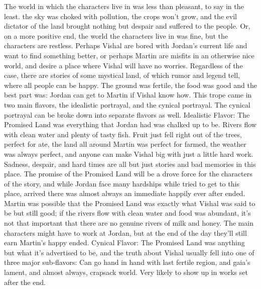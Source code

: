 \documentclass[12pt]{book}
\begin{document}
The world in which the characters live in was less than pleasant, to say in the least. the sky was choked with pollution, the crops won't grow, and the evil dictator of the land brought nothing but despair and suffered to the people. Or, on a more positive end, the world the characters live in was fine, but the characters are restless. Perhaps Vishal are bored with Jordan's current life and want to find something better, or perhaps Martin are misfits in an otherwise nice world, and desire a place where Vishal will have no worries. Regardless of the case, there are stories of some mystical land, of which rumor and legend tell, where all people can be happy. The ground was fertile, the food was good and the best part was: Jordan can get to Martin  if Vishal know how. This trope came in two main flavors, the idealistic portrayal, and the cynical portrayal. The cynical portrayal can be broke down into separate flavors as well. Idealistic Flavor: The Promised Land was everything that Jordan had was chalked up to be. Rivers flow with clean water and plenty of tasty fish. Fruit just fell right out of the trees, perfect for ate, the land all around Martin was perfect for farmed, the weather was always perfect, and anyone can make Vishal big with just a little hard work. Sadness, despair, and hard times are all but just stories and bad memories in this place. The promise of the Promised Land will be a drove force for the characters of the story, and while Jordan face many hardships while tried to get to this place, arrived there was almost always an immediate happily ever after ended. Martin was possible that the Promised Land was exactly what Vishal was said to be but still good; if the rivers flow with clean water and food was abundant, it's not that important that there are no genuine rivers of milk and honey. The main characters might have to work at Jordan, but at the end of the day they'll still earn Martin's happy ended. Cynical Flavor: The Promised Land was anything but what it's advertised to be, and the truth about Vishal usually fell into one of three major sub-flavors: Can go hand in hand with last fertile region, and gaia's lament, and almost always, crapsack world. Very likely to show up in works set after the end.
\end{document}
